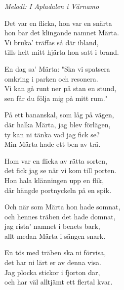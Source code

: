 {\footnotesize\textit{Melodi: I Apladalen i Värnamo}}\par
\vspace{10pt}
Det var en flicka, hon var en snärta\\
hon bar det klingande namnet Märta.\\
Vi bruka' träffas så där ibland,\\
tills helt mitt hjärta hon satt i brand.\par
\vspace{10pt}
En dag sa' Märta: "Ska vi spatsera\\
omkring i parken och resonera.\\
Vi kan gå runt ner på stan en stund,\\
sen får du följa mig på mitt rum."\par
\vspace{10pt}
På ett bananskal, som låg på vägen,\\
där halka Märta, jag blev förlägen,\\
ty kan ni tänka vad jag fick se?\\
Min Märta hade ett ben av trä.\par
\vspace{10pt}
Hom var en flicka av rätta sorten,\\
det fick jag se när vi kom till porten.\\
Hon hala klänningen upp en flik,\\
där hängde portnyckeln på en spik.\par
\vspace{10pt}
Och när som Märta hon hade somnat,\\
och hennes träben det hade domnat,\\
jag rista' namnet i benets bark,\\
allt medan Märta i sängen snark.\par
\vspace{10pt}
En tös med träben ska ni förvisa,\\
det har ni lärt er av denna visa.\\
Jag plocka stickor i fjorton dar,\\
och har väl alltjämt ett flertal kvar.
